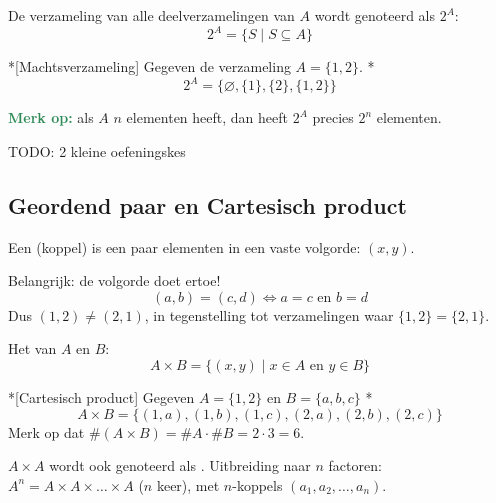 
De verzameling van alle deelverzamelingen van $A$ wordt genoteerd als $2^{A}$:
\begin{equation}
    2^{A} = \{S \mid S \subseteq A\}
\end{equation}

\begin{niceexample}*[Machtsverzameling]
    Gegeven de verzameling $A = \{1,2\}$.
    \nextpart[Dan:]*
    \begin{equation*}
        2^{A} = \{\varnothing, \{1\}, \{2\}, \{1,2\}\}
    \end{equation*}
\end{niceexample}

\begin{barbox}[SeaGreen][gray!5]
    \textcolor{SeaGreen}{\textbf{Merk op:}} als $A$ $n$ elementen heeft, dan heeft $2^{A}$ precies $2^n$ elementen.
\end{barbox}

\colorbox{magenta!66}{TODO: 2 kleine oefeningskes}


\subsection{Geordend paar en Cartesisch product}

Een  (koppel) is een paar elementen in een vaste volgorde: $(x,y)$.

Belangrijk: de volgorde doet ertoe!
\begin{equation*}
    (a,b) = (c,d) \Longleftrightarrow a=c \text{ en } b=d
\end{equation*}
Dus $(1,2) \neq (2,1)$, in tegenstelling tot verzamelingen waar $\{1,2\} = \{2,1\}$.

Het  van $A$ en $B$:
\begin{equation}
    A \times B = \{(x,y) \mid x \in A \text{ en } y \in B\}
\end{equation}

\begin{niceexample}*[Cartesisch product]
    Gegeven $A = \{1,2\}$ en $B = \{a,b,c\}$
    \nextpart[Dan]*
    \begin{equation*}
        A \times B = \{(1,a), (1,b), (1,c), (2,a), (2,b), (2,c)\}
    \end{equation*}
    Merk op dat $\#(A \times B) = \#A \cdot \#B = 2 \cdot 3 = 6$.
\end{niceexample}
$A\times A$ wordt ook genoteerd als . Uitbreiding naar $n$ factoren: $A^n = A \times A \times \dots \times A$ ($n$ keer), met $n$-koppels $(a_1, a_2, \dots, a_n)$.

